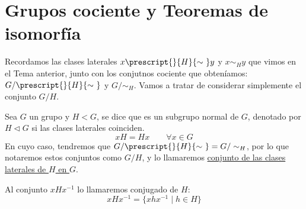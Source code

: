 \chapter{Grupos cociente y Teoremas de isomorfía}
Recordamos las clases laterales $x\prescript{}{H}{\sim\ } y$ y $x\sim_H y$ que vimos en el Tema anterior, junto con los conjutnos cociente que obteníamos: $G/\prescript{}{H}{\sim\ } $ y $G/\sim_H$. Vamos a tratar de considerar simplemente el conjunto $G/H$.

\begin{definicion}
    Sea $G$ un grupo y $H<G$, se dice que es un subgrupo normal de $G$, denotado por $H \lhd G$ si las clases laterales coinciden.
    \begin{equation*}
        xH = Hx \qquad \forall x\in G
    \end{equation*}
    En cuyo caso, tendremos que $G/\prescript{}{H}{\sim\ } = G/\sim_H$, por lo que notaremos estos conjuntos como $G/H$, y lo llamaremos \underline{conjunto de las clases laterales de $H$ en $G$}. 
\end{definicion}

\begin{definicion}[Conjugado]
    Al conjunto $xHx^{-1}$ lo llamaremos conjugado de $H$:
    \begin{equation*}
        xHx^{-1} = \{xhx^{-1} \mid h\in H\}
    \end{equation*}
\end{definicion}

